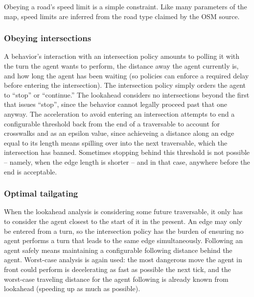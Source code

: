 \documentclass[letterpaper, 10 pt, conference]{ieeeconf}  %
\begin{document}
Obeying a road's speed limit is a simple constraint. Like many parameters of the
map, speed limits are inferred from the road type claimed by the OSM source.

\subsubsection{Obeying intersections}

A behavior's interaction with an intersection policy amounts to polling it with
the turn the agent wants to perform, the distance away the agent currently is,
and how long the agent has been waiting (so policies can enforce a required
delay before entering the intersection). The intersection policy simply orders
the agent to ``stop'' or ``continue.'' The lookahead considers no intersections
beyond the first that issues ``stop'', since the behavior cannot legally proceed
past that one anyway. The acceleration to avoid entering an intersection
attempts to end a configurable threshold back from the end of a traversable to
account for crosswalks and as an epsilon value, since achieveing a distance
along an edge equal to its length means spilling over into the next traversable,
which the intersection has banned. Sometimes stopping behind this threshold is
not possible -- namely, when the edge length is shorter -- and in that case,
anywhere before the end is acceptable.


\subsubsection{Optimal tailgating}


When the lookahead analysis is considering some future traversable, it only has
to consider the agent closest to the start of it in the present. An edge may
only be entered from a turn, so the intersection policy has the burden of
ensuring no agent performs a turn that leads to the same edge simultaneously.
Following an agent safely means maintaining a configurable following distance
behind the agent. Worst-case analysis is again used: the most dangerous move the
agent in front could perform is decelerating as fast as possible the next tick,
and the worst-case traveling distance for the agent following is already known
from lookahead (speeding up as much as possible).
\end{document}
